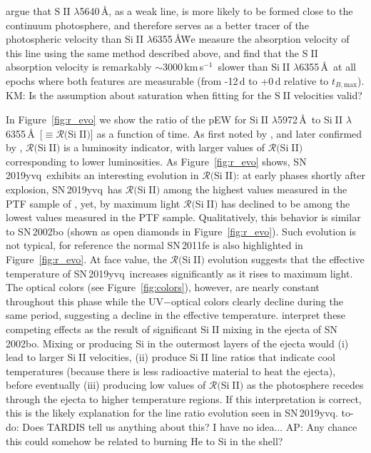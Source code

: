 \documentclass[twocolumn]{aastex63}
\def\ion#1#2{#1$\;${\footnotesize\rm{#2}}\relax}
\newcommand{\kate}[1]{{\color{red} KM: {#1}}}
\newcommand{\abi}[1]{{\color{LincolnGreen} AP: {#1}}}
\newcommand{\todo}[1]{{\color{magenta} to-do: {#1}}}
\newcommand{\tbmax}{$t_{B,\mathrm{max}}$}
\newcommand{\kms}{km\,s$^{-1}$}
\newcommand{\sn}{SN\,2019yvq}
\begin{document}
\citet{Benetti04} argue that \ion{S}{II} $\lambda$5640\,\AA, as a weak line,
is more likely to be formed close to the continuum photosphere, and therefore
serves as a better tracer of the photospheric velocity than \ion{Si}{II}
$\lambda$6355\,\AA\. We measure the absorption velocity of this line using
the same method described above, and find that the \ion{S}{II} absorption
velocity is remarkably $\sim$3000\,\kms\ slower than \ion{Si}{II}
$\lambda$6355\,\AA\ at all epochs where both features are measurable (from
-12\,d to +0\,d relative to \tbmax). \kate{Is the assumption about saturation
when fitting for the \ion{S}{II} velocities valid?} 

In Figure~\ref{fig:r_evo} we show the ratio of the pEW for \ion{Si}{II}
$\lambda$5972\,\AA\ to \ion{Si}{II} $\lambda$6355\,\AA\ [$\equiv
\mathcal{R}($\ion{Si}{II}$)$] as a function of time. As first noted by
\citet{Nugent95}, and later confirmed by \citet{Hachinger08},
$\mathcal{R}($\ion{Si}{II}$)$ is a luminosity indicator, with larger values
of $\mathcal{R}($\ion{Si}{II}$)$ corresponding to lower luminosities. As
Figure~\ref{fig:r_evo} shows, \sn\ exhibits an interesting evolution in
$\mathcal{R}($\ion{Si}{II}$)$: at early phases shortly after explosion, \sn\
has $\mathcal{R}($\ion{Si}{II}$)$ among the highest values measured in the
PTF sample of \citet{Maguire14}, yet, by maximum light
$\mathcal{R}($\ion{Si}{II}$)$ has declined to be among the lowest values
measured in the PTF sample. Qualitatively, this behavior is similar to
SN\,2002bo (shown as open diamonds in Figure~\ref{fig:r_evo}). Such evolution
is not typical, for reference the normal SN\,2011fe is also highlighted in
Figure~\ref{fig:r_evo}. At face value, the $\mathcal{R}($\ion{Si}{II}$)$
evolution suggests that the effective temperature of \sn\ increases
significantly as it rises to maximum light. The optical colors (see
Figure~\ref{fig:colors}), however, are nearly constant throughout this phase
while the UV$ - $optical colors clearly decline during the same period,
suggesting a decline in the effective temperature. \citet{Benetti04}
interpret these competing effects as the result of significant \ion{Si}{II}
mixing in the ejecta of SN\,2002bo. Mixing or producing Si in the outermost
layers of the ejecta would (i) lead to larger \ion{Si}{II} velocities, (ii)
produce \ion{Si}{II} line ratios that indicate cool temperatures (because
there is less radioactive material to heat the ejecta), before eventually
(iii) producing low values of $\mathcal{R}($\ion{Si}{II}$)$ as the
photosphere recedes through the ejecta to higher temperature regions. If this
interpretation is correct, this is the likely explanation for the line ratio
evolution seen in \sn. \todo{Does TARDIS tell us anything about this? I have
no idea...} \abi{Any chance this could somehow be related to burning He to Si in the shell?}
\end{document}
